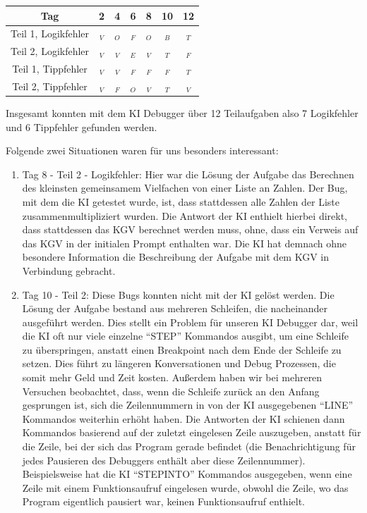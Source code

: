 \documentclass[a4paper,12pt,ngerman]{scrartcl}
\newcommand{\cmark}{\ding{51}}%
\newcommand{\xmark}{\ding{55}}%
\begin{document}
\begin{center}
\begin{tabular}{|c|c|c|c|c|c|c|}
	\hline
 	Tag                 &  2         &  4         &  6         &  8         & 10          & 12         \\
	\hline
	Teil 1, Logikfehler & \cmark$_V$ & \cmark$_O$ & \xmark$_F$ & \cmark$_O$ &  \xmark$_B$ & \xmark$_T$ \\
	Teil 2, Logikfehler & \cmark$_V$ & \cmark$_V$ & \cmark$_E$ & \cmark$_V$ &  \xmark$_T$ & \xmark$_F$ \\
	Teil 1, Tippfehler  & \cmark$_V$ & \cmark$_V$ & \xmark$_F$ & \xmark$_F$ &  \xmark$_F$ & \xmark$_T$ \\
	Teil 2, Tippfehler  & \cmark$_V$ & \xmark$_F$ & \cmark$_O$ & \cmark$_V$ &  \xmark$_T$ & \cmark$_V$ \\
	\hline
\end{tabular}
\end{center}

Insgesamt konnten mit dem KI Debugger über 12 Teilaufgaben also 7 Logikfehler und 6 Tippfehler gefunden werden.

Folgende zwei Situationen waren für uns besonders interessant:
\begin{enumerate}
\item Tag 8 - Teil 2 - Logikfehler: Hier war die Lösung der Aufgabe das Berechnen des kleinsten gemeinsamem Vielfachen von einer Liste an Zahlen. Der Bug, mit dem die KI getestet wurde, ist, dass stattdessen alle Zahlen der Liste zusammenmultipliziert wurden. Die Antwort der KI enthielt hierbei direkt, dass stattdessen das KGV berechnet werden muss, ohne, dass ein Verweis auf das KGV in der initialen Prompt enthalten war. Die KI hat demnach ohne besondere Information die Beschreibung der Aufgabe mit dem KGV in Verbindung gebracht.
\item Tag 10 - Teil 2: Diese Bugs konnten nicht mit der KI gelöst werden. Die Lösung der Aufgabe bestand aus mehreren Schleifen, die nacheinander ausgeführt werden. Dies stellt ein Problem für unseren KI Debugger dar, weil die KI oft nur viele einzelne ``STEP'' Kommandos ausgibt, um eine Schleife zu überspringen, anstatt einen Breakpoint nach dem Ende der Schleife zu setzen. Dies führt zu längeren Konversationen und Debug Prozessen, die somit mehr Geld und Zeit kosten. Außerdem haben wir bei mehreren Versuchen beobachtet, dass, wenn die Schleife zurück an den Anfang gesprungen ist, sich die Zeilennummern in von der KI ausgegebenen ``LINE'' Kommandos weiterhin erhöht haben. Die Antworten der KI schienen dann Kommandos basierend auf der zuletzt eingelesen Zeile auszugeben, anstatt für die Zeile, bei der sich das Program gerade befindet (die Benachrichtigung für jedes Pausieren des Debuggers enthält aber diese Zeilennummer). Beispielsweise hat die KI ``STEPINTO'' Kommandos ausgegeben, wenn eine Zeile mit einem Funktionsaufruf eingelesen wurde, obwohl die Zeile, wo das Program eigentlich pausiert war, keinen Funktionsaufruf enthielt.
\end{enumerate}
\end{document}
